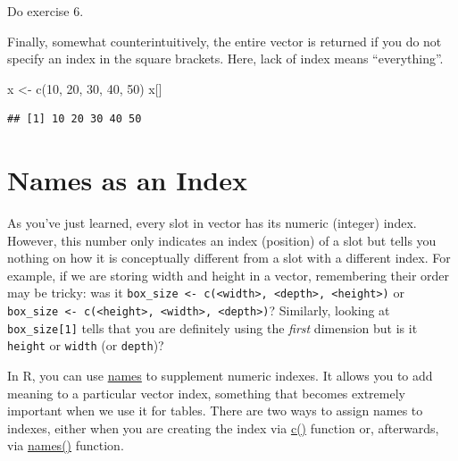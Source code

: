 \documentclass[
]{book}
\newenvironment{Shaded}{\begin{snugshade}}{\end{snugshade}}
\newcommand{\DecValTok}[1]{\textcolor[rgb]{0.00,0.00,0.81}{#1}}
\newcommand{\FunctionTok}[1]{\textcolor[rgb]{0.00,0.00,0.00}{#1}}
\newcommand{\NormalTok}[1]{#1}
\newcommand{\OtherTok}[1]{\textcolor[rgb]{0.56,0.35,0.01}{#1}}
\begin{document}
Do exercise 6.

Finally, somewhat counterintuitively, the entire vector is returned if you do not specify an index in the square brackets. Here, lack of index means ``everything''.

\begin{Shaded}
\begin{Highlighting}[]
\NormalTok{x }\OtherTok{\textless{}{-}} \FunctionTok{c}\NormalTok{(}\DecValTok{10}\NormalTok{, }\DecValTok{20}\NormalTok{, }\DecValTok{30}\NormalTok{, }\DecValTok{40}\NormalTok{, }\DecValTok{50}\NormalTok{)}
\NormalTok{x[]}
\end{Highlighting}
\end{Shaded}

\begin{verbatim}
## [1] 10 20 30 40 50
\end{verbatim}

\hypertarget{names}{%
\section{Names as an Index}\label{names}}

As you've just learned, every slot in vector has its numeric (integer) index. However, this number only indicates an index (position) of a slot but tells you nothing on how it is conceptually different from a slot with a different index. For example, if we are storing width and height in a vector, remembering their order may be tricky: was it \texttt{box\_size\ \textless{}-\ c(\textless{}width\textgreater{},\ \textless{}depth\textgreater{},\ \textless{}height\textgreater{})} or \texttt{box\_size\ \textless{}-\ c(\textless{}height\textgreater{},\ \textless{}width\textgreater{},\ \textless{}depth\textgreater{})}? Similarly, looking at \texttt{box\_size{[}1{]}} tells that you are definitely using the \emph{first} dimension but is it \texttt{height} or \texttt{width} (or \texttt{depth})?

In R, you can use \href{https://stat.ethz.ch/R-manual/R-devel/library/base/html/names.html}{names} to supplement numeric indexes. It allows you to add meaning to a particular vector index, something that becomes extremely important when we use it for tables. There are two ways to assign names to indexes, either when you are creating the index via \href{https://stat.ethz.ch/R-manual/R-devel/library/base/html/c.html}{c()} function or, afterwards, via \href{https://stat.ethz.ch/R-manual/R-devel/library/base/html/names.html}{names()} function.
\end{document}
